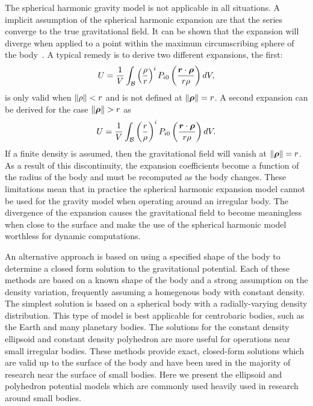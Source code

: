 The spherical harmonic gravity model is not applicable in all situations.
A implicit assumption of the spherical harmonic expansion are that the series converge to the true gravitational field.
It can be shown that the expansion will diverge when applied to a point within the maximum circumscribing sphere of the body~\cite{scheeres2012a}.
A typical remedy is to derive two different expansions, the first:
\begin{align}
    U = \frac{1}{V} \int_{\mathcal{B}} \left(  \frac{\rho}{r} \right)^i P_{i0} \left(  \frac{\bm{r} \cdot \bm{\rho}}{ r \rho} \right) dV, 
\end{align}
is only valid when \( \left\| \rho \right\| < r \) and is not defined at \( \left\| \bm{\rho} \right\| = r\).
A second expansion can be derived for the case \(\left\| \bm{\rho} \right\| > r \) as
\begin{align}
    U = \frac{1}{V} \int_{\mathcal{B}} \left(  \frac{r}{\rho} \right)^i P_{i0} \left(  \frac{\bm{r} \cdot \bm{\rho}}{ r \rho} \right) dV. 
\end{align}
If a finite density is assumed, then the gravitational field will vanish at \( \left\| \bm{\rho} \right\| = r \).
As a result of this discontinuity, the expansion coefficients become a function of the radius of the body and must be recomputed as the body changes.
These limitations mean that in practice the spherical harmonic expansion model cannot be used for the gravity model when operating around an irregular body.
The divergence of the expansion causes the gravitational field to become meaningless when close to the surface and make the use of the spherical harmonic model worthless for dynamic computations.


An alternative approach is based on using a specified shape of the body to determine a closed form solution to the gravitational potential.
Each of these methods are based on a known shape of the body and a strong assumption on the density variation, frequently assuming a homegenous body with constant density.
The simplest solution is based on a spherical body with a radially-varying density distribution.
This type of model is best applicable for centrobaric bodies, such as the Earth and many planetary bodies.
The solutions for the constant density ellipsoid and constant density polyhedron are more useful for operations near small irregular bodies.
These methods provide exact, closed-form solutions which are valid up to the surface of the body and have been used in the majority of research near the surface of small bodies.
Here we present the ellipsoid and polyhedron potential models which are commonly used heavily used in research around small bodies.

